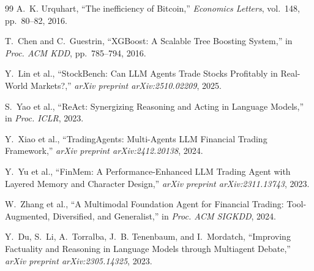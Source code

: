 \documentclass[12pt, a4paper]{report}
\begin{document}
\begin{thebibliography}{99}
  A.~K. Urquhart, ``The inefficiency of Bitcoin,''
  \textit{Economics Letters}, vol.~148, pp.~80--82, 2016.

  T.~Chen and C.~Guestrin, ``XGBoost: A Scalable Tree Boosting System,''
  in \textit{Proc. ACM KDD}, pp.~785--794, 2016.

  Y.~Lin et al., ``StockBench: Can LLM Agents Trade Stocks Profitably in Real-World Markets?,''
  \textit{arXiv preprint arXiv:2510.02209}, 2025.

  S.~Yao et al., ``ReAct: Synergizing Reasoning and Acting in Language Models,''
  in \textit{Proc. ICLR}, 2023.

  Y.~Xiao et al., ``TradingAgents: Multi-Agents LLM Financial Trading Framework,''
  \textit{arXiv preprint arXiv:2412.20138}, 2024.

  Y.~Yu et al., ``FinMem: A Performance-Enhanced LLM Trading Agent with Layered Memory and Character Design,''
  \textit{arXiv preprint arXiv:2311.13743}, 2023.

  W.~Zhang et al., ``A Multimodal Foundation Agent for Financial Trading: Tool-Augmented, Diversified, and Generalist,''
  in \textit{Proc. ACM SIGKDD}, 2024.

  Y.~Du, S.~Li, A.~Torralba, J.~B. Tenenbaum, and I.~Mordatch, ``Improving Factuality and Reasoning in Language Models through Multiagent Debate,''
  \textit{arXiv preprint arXiv:2305.14325}, 2023.
\end{thebibliography}
\end{document}

